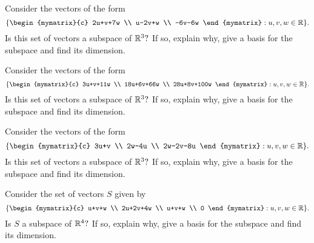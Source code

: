\begin{enumialphparenastyle}
\begin{ex} Consider the vectors of the form 
\begin{equation*}
\set{\begin{mymatrix}{c}
2u+v+7w \\ 
u-2v+w \\ 
-6v-6w
\end{mymatrix} :u,v,w\in \R} .
\end{equation*}
Is this set of vectors a subspace of $\mathbb{R}^{3}?$ If so, explain why,
give a basis for the subspace and find its dimension.
\end{ex}

\begin{ex} Consider the vectors of the form 
\begin{equation*}
\set{\begin{mymatrix}{c}
3u+v+11w \\ 
18u+6v+66w \\ 
28u+8v+100w
\end{mymatrix} :u,v,w\in \R} .
\end{equation*}
Is this set of vectors a subspace of $\mathbb{R}^{3}?$ If so, explain why,
give a basis for the subspace and find its dimension.
\end{ex}

\begin{ex} Consider the vectors of the form 
\begin{equation*}
\set{\begin{mymatrix}{c}
3u+v \\ 
2w-4u \\ 
2w-2v-8u
\end{mymatrix} :u,v,w\in \R} .
\end{equation*}
Is this set of vectors a subspace of $\mathbb{R}^{3}?$ If so, explain why,
give a basis for the subspace and find its dimension.
\end{ex}

\begin{ex} Consider the set of vectors $S$ given by  
\begin{equation*}
\set{\begin{mymatrix}{c}
u+v+w \\ 
2u+2v+4w \\ 
u+v+w \\ 
0
\end{mymatrix} :u,v,w\in \R} .
\end{equation*}
Is $S$ a subspace of $\mathbb{R}^{4}?$ If so, explain why,
give a basis for the subspace and find its dimension.
\end{ex}


\end{enumialphparenastyle}
